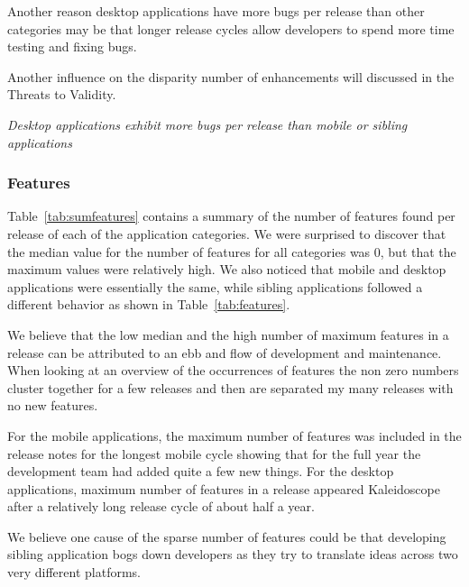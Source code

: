 \documentclass{acm_proc_article-sp}
\begin{document}
Another reason desktop applications have more bugs per release than other categories may be that longer release cycles allow developers to spend more time testing and fixing bugs. 

Another influence on the disparity number of enhancements will discussed in the Threats to Validity.

\textit{Desktop applications exhibit more bugs per release than mobile or sibling applications}

\subsubsection{Features}

\begin{center}


\end{center}

\begin{center}


\end{center}

Table~\ref{tab:sumfeatures} contains a summary of the number of features found per release of each of the application categories. 
We were surprised to discover that the median value for the number of features for all categories was 0, but that the maximum values were relatively high.
We also noticed that mobile and desktop applications were essentially the same, while sibling applications followed a different behavior as shown in Table~\ref{tab:features}.

We believe that the low median and the high number of maximum features in a release can be attributed to an ebb and flow of development and maintenance. 
When looking at an overview of the occurrences of features the non zero numbers cluster together for a few releases and then are separated my many releases with no new features.

For the mobile applications, the maximum number of features was included in the release notes for the longest mobile cycle showing that for the full year the development team had added quite a few new things. 
For the desktop applications, maximum number of features in a release appeared Kaleidoscope after a relatively long release cycle of about half a year.

We believe one cause of the sparse number of features could be that developing sibling application bogs down developers as they try to translate ideas across two very different platforms. 
\end{document}
